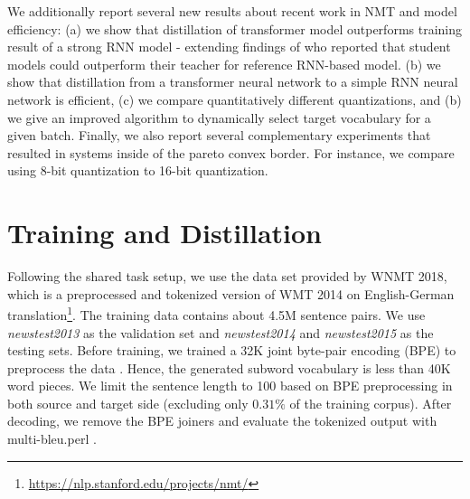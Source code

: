 \documentclass[11pt,a4paper]{article}
\begin{document}
We additionally report several new results about recent work in NMT
and model efficiency: (a) we show that distillation of transformer
model outperforms training result of a strong RNN model - extending
findings of  who reported that
student models could outperform their teacher for reference RNN-based
model. (b) we show that distillation from a transformer neural network
to a simple RNN neural network is efficient, (c) we compare
quantitatively different quantizations, and (b) we give an improved
algorithm to dynamically select  target vocabulary for a given batch.
Finally, we also report several complementary experiments that
resulted in  systems inside of the pareto convex border. For instance, we
compare using 8-bit quantization to 16-bit quantization.

%

\section{Training and Distillation}


Following the shared task setup, we use the data set provided by WNMT
2018, which is a preprocessed and tokenized version of WMT 2014 on
English-German
translation\footnote{\url{https://nlp.stanford.edu/projects/nmt/}}. The
training data contains about 4.5M sentence pairs. We use {\it newstest2013}
as the validation set and {\it newstest2014} and {\it newstest2015} as the testing
sets. Before training, we trained a 32K joint byte-pair encoding (BPE)
to preprocess the data \cite{sennrich2015neural}. Hence, the generated
subword vocabulary is less than 40K word pieces. We limit the sentence
length to 100 based on BPE preprocessing in both source and target
side (excluding only $0.31\%$ of the training corpus). After decoding,
we remove the BPE joiners and evaluate the tokenized output with
multi-bleu.perl \cite{koehn2007moses}.
\end{document}
